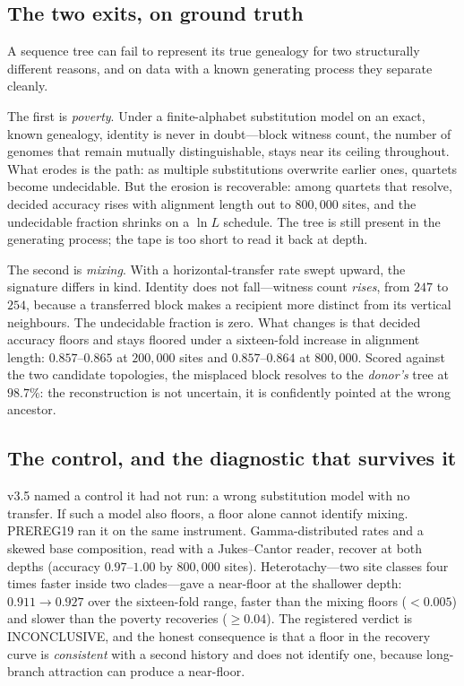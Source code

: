 \documentclass[11pt]{article}
\begin{document}
\subsection{The two exits, on ground truth}

A sequence tree can fail to represent its true genealogy for two structurally different reasons, and on data with a known generating process they separate cleanly.

The first is \emph{poverty}. Under a finite-alphabet substitution model on an exact, known genealogy, identity is never in doubt---block witness count, the number of genomes that remain mutually distinguishable, stays near its ceiling throughout. What erodes is the path: as multiple substitutions overwrite earlier ones, quartets become undecidable. But the erosion is recoverable: among quartets that resolve, decided accuracy rises with alignment length out to $800{,}000$ sites, and the undecidable fraction shrinks on a $\ln L$ schedule. The tree is still present in the generating process; the tape is too short to read it back at depth.

The second is \emph{mixing}. With a horizontal-transfer rate swept upward, the signature differs in kind. Identity does not fall---witness count \emph{rises}, from $247$ to $254$, because a transferred block makes a recipient more distinct from its vertical neighbours. The undecidable fraction is zero. What changes is that decided accuracy floors and stays floored under a sixteen-fold increase in alignment length: $0.857$--$0.865$ at $200{,}000$ sites and $0.857$--$0.864$ at $800{,}000$. Scored against the two candidate topologies, the misplaced block resolves to the \emph{donor's} tree at $98.7\%$: the reconstruction is not uncertain, it is confidently pointed at the wrong ancestor.

\subsection{The control, and the diagnostic that survives it}

v3.5 named a control it had not run: a wrong substitution model with no transfer. If such a model also floors, a floor alone cannot identify mixing. PREREG19 ran it on the same instrument. Gamma-distributed rates and a skewed base composition, read with a Jukes--Cantor reader, recover at both depths (accuracy $0.97$--$1.00$ by $800{,}000$ sites). Heterotachy---two site classes four times faster inside two clades---gave a near-floor at the shallower depth: $0.911\to0.927$ over the sixteen-fold range, faster than the mixing floors ($<0.005$) and slower than the poverty recoveries ($\ge0.04$). The registered verdict is INCONCLUSIVE, and the honest consequence is that a floor in the recovery curve is \emph{consistent} with a second history and does not identify one, because long-branch attraction can produce a near-floor.
\end{document}
